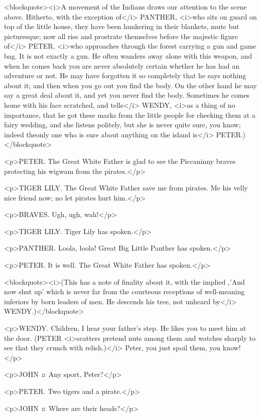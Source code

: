 <blockquote><i>A movement of the Indians draws our attention to the scene above. Hitherto, with the exception of</i> PANTHER, <i>who sits on guard on top of the little house, they have been hunkering in their blankets, mute but picturesque; now all rise and prostrate themselves before the majestic figure of</i> PETER, <i>who approaches through the forest carrying a gun and game bag. It is not exactly a gun. He often wanders away alone with this weapon, and when he comes back you are never absolutely certain whether he has had an adventure or not. He may have forgotten it so completely that he says nothing about it; and then when you go out you find the body. On the other hand he may say a great deal about it, and yet you never find the body. Sometimes he comes home with his face scratched, and tells</i> WENDY, <i>as a thing of no importance, that he got these marks from the little people for cheeking them at a fairy wedding, and she listens politely, but she is never quite sure, you know; indeed theonly one who is sure about anything on the island is</i> PETER.)</blockquote>

<p>PETER. The Great White Father is glad to see the Piccaninny braves protecting his wigwam from the pirates.</p>

<p>TIGER LILY. The Great White Father save me from pirates. Me his velly nice friend now; no let pirates hurt him.</p>

<p>BRAVES. Ugh, ugh, wah!</p>

<p>TIGER LILY. Tiger Lily has spoken.</p>

<p>PANTHER. Loola, loola! Great Big Little Panther has spoken.</p>

<p>PETER. It is well. The Great White Father has spoken.</p>

<blockquote><i>(This has a note of finality about it, with the implied ,'And now shut up' which is never far from the courteous receptions of well-meaning inferiors by born leaders of men. He descends his tree, not unheard by</i> WENDY.)</blockquote>

<p>WENDY. Children, I hear your father's step. He likes you to meet him at the door. (PETER <i>scatters pretend nuts among them and watches sharply to see that they crunch with relish.)</i> Peter, you just spoil them, you know!</p>

<p>JOHN ¤
Any sport, Peter?</p>

<p>PETER. Two tigers and a pirate.</p>

<p>JOHN ¤
Where are their heads?</p>

